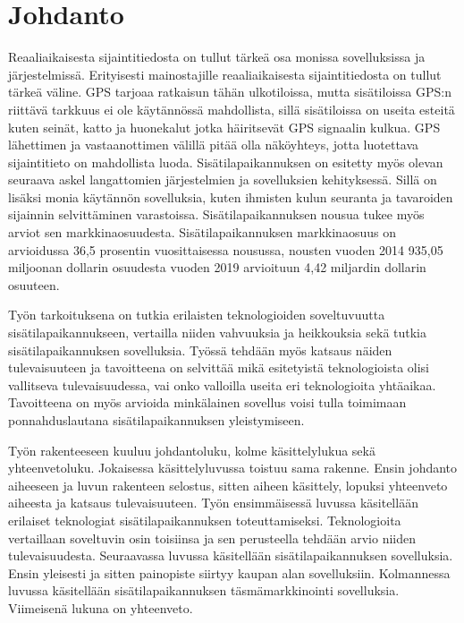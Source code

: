 \section{Johdanto}

Reaaliaikaisesta sijaintitiedosta on tullut tärkeä osa monissa sovelluksissa ja järjestelmissä\cite{D}. Erityisesti mainostajille reaaliaikaisesta sijaintitiedosta on tullut tärkeä väline\cite{geo}. GPS tarjoaa ratkaisun tähän ulkotiloissa, mutta sisätiloissa GPS:n riittävä tarkkuus ei ole käytännössä mahdollista, sillä sisätiloissa on useita esteitä kuten seinät, katto ja huonekalut jotka häiritsevät GPS signaalin kulkua. GPS lähettimen ja vastaanottimen välillä pitää olla näköyhteys, jotta luotettava sijaintitieto on mahdollista luoda.\cite{D,B} 
Sisätilapaikannuksen on esitetty myös olevan seuraava askel langattomien järjestelmien ja sovelluksien kehityksessä\cite{C}. Sillä on lisäksi monia käytännön sovelluksia, kuten ihmisten kulun seuranta ja tavaroiden sijainnin selvittäminen varastoissa\cite{A}.
Sisätilapaikannuksen nousua tukee myös arviot sen markkinaosuudesta. Sisätilapaikannuksen markkinaosuus on arvioidussa 36,5 prosentin vuosittaisessa nousussa, nousten vuoden 2014 935,05 miljoonan dollarin osuudesta vuoden 2019 arvioituun 4,42 miljardin dollarin osuuteen\cite{reuters}.

Työn tarkoituksena on tutkia erilaisten teknologioiden soveltuvuutta sisätilapaikannukseen, vertailla niiden vahvuuksia ja heikkouksia sekä tutkia sisätilapaikannuksen sovelluksia. Työssä tehdään myös katsaus näiden tulevaisuuteen ja tavoitteena on selvittää mikä esitetyistä teknologioista olisi vallitseva tulevaisuudessa, vai onko valloilla useita eri teknologioita yhtäaikaa. Tavoitteena on myös arvioida minkälainen sovellus voisi tulla toimimaan ponnahduslautana sisätilapaikannuksen yleistymiseen.

Työn rakenteeseen kuuluu johdantoluku, kolme käsittelylukua sekä yhteenvetoluku. Jokaisessa käsittelyluvussa toistuu sama rakenne. Ensin johdanto aiheeseen ja luvun rakenteen selostus, sitten aiheen käsittely, lopuksi yhteenveto aiheesta ja katsaus tulevaisuuteen.  
Työn ensimmäisessä luvussa käsitellään erilaiset teknologiat sisätilapaikannuksen toteuttamiseksi. Teknologioita vertaillaan soveltuvin osin toisiinsa ja sen perusteella tehdään arvio niiden tulevaisuudesta. Seuraavassa luvussa käsitellään sisätilapaikannuksen sovelluksia. Ensin yleisesti ja sitten painopiste siirtyy kaupan alan sovelluksiin. Kolmannessa luvussa käsitellään sisätilapaikannuksen täsmämarkkinointi sovelluksia. Viimeisenä lukuna on yhteenveto.
